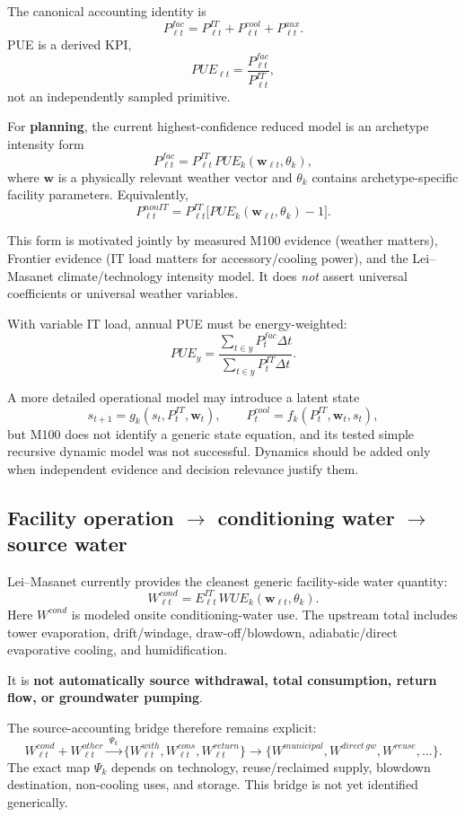 \documentclass[11pt]{article}
\begin{document}
The canonical accounting identity is
\[
\boxed{P^{fac}_{\ell t}=P^{IT}_{\ell t}+P^{cool}_{\ell t}+P^{aux}_{\ell t}.}
\]
PUE is a derived KPI,
\[
PUE_{\ell t}=\frac{P^{fac}_{\ell t}}{P^{IT}_{\ell t}},
\]
not an independently sampled primitive.

For \textbf{planning}, the current highest-confidence reduced model is an archetype intensity form
\[
\boxed{P^{fac}_{\ell t}
=P^{IT}_{\ell t}\,PUE_k(\mathbf w_{\ell t},\theta_k),}
\]
where $\mathbf w$ is a physically relevant weather vector and $\theta_k$ contains archetype-specific facility parameters. Equivalently,
\[
P^{nonIT}_{\ell t}=P^{IT}_{\ell t}\bigl[PUE_k(\mathbf w_{\ell t},\theta_k)-1\bigr].
\]

This form is motivated jointly by measured M100 evidence (weather matters), Frontier evidence (IT load matters for accessory/cooling power), and the Lei--Masanet climate/technology intensity model. It does \emph{not} assert universal coefficients or universal weather variables.

With variable IT load, annual PUE must be energy-weighted:
\[
\boxed{PUE_y=\frac{\sum_{t\in y}P^{fac}_t\Delta t}{\sum_{t\in y}P^{IT}_t\Delta t}.}
\]

A more detailed operational model may introduce a latent state
\[
s_{t+1}=g_k(s_t,P^{IT}_t,\mathbf w_t),\qquad
P^{cool}_t=f_k(P^{IT}_t,\mathbf w_t,s_t),
\]
but M100 does not identify a generic state equation, and its tested simple recursive dynamic model was not successful. Dynamics should be added only when independent evidence and decision relevance justify them.

\subsection{Facility operation $\rightarrow$ conditioning water $\rightarrow$ source water}

Lei--Masanet currently provides the cleanest generic facility-side water quantity:
\[
\boxed{W^{cond}_{\ell t}
=E^{IT}_{\ell t}\,WUE_k(\mathbf w_{\ell t},\theta_k).}
\]
Here $W^{cond}$ is modeled onsite conditioning-water use. The upstream total includes tower evaporation, drift/windage, draw-off/blowdown, adiabatic/direct evaporative cooling, and humidification.\par
It is \textbf{not automatically source withdrawal, total consumption, return flow, or groundwater pumping}.

The source-accounting bridge therefore remains explicit:
\[
\boxed{
W^{cond}_{\ell t}+W^{other}_{\ell t}
\xrightarrow{\ \Psi_k\ }
\{W^{with}_{\ell t},W^{cons}_{\ell t},W^{return}_{\ell t}\}
\rightarrow \{W^{municipal},W^{direct\,gw},W^{reuse},\ldots\}.
}
\]
The exact map $\Psi_k$ depends on technology, reuse/reclaimed supply, blowdown destination, non-cooling uses, and storage. This bridge is not yet identified generically.
\end{document}
